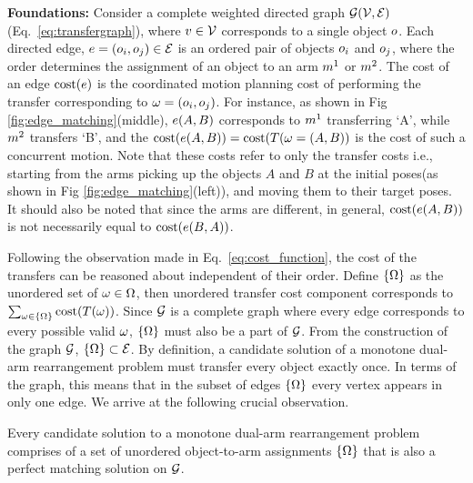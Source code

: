 \noindent\textbf{Foundations:} Consider a complete weighted directed graph $\mathcal{G}(\mathcal{V},\mathcal{E})$ (Eq.~\ref{eq:transfergraph}), where ${v} \in \mathcal{V}$ corresponds to a single object $ o $. Each directed edge, ${e}=(o_i,o_j) \in \mathcal{E}$ is an ordered pair of objects $ o_i $ and $o_j $, where the order determines the assignment of an object to an arm $ m^1 $ or $ m^2 $. The cost of an edge $ \textup{cost}({e}) $ is the coordinated motion planning cost of performing the transfer corresponding to $ {\omega} = (o_i,o_j) $. For instance, as shown in Fig \ref{fig:edge_matching}(middle), ${e}(A,B)$ corresponds to $ m^1 $ transferring `A', while $ m^2 $ transfers `B', and the $\textup{cost}( {e}(A,B) ) = \textup{cost}(T({\omega}=(A,B))$ is the cost of such a concurrent motion. Note that these costs refer to only the transfer costs i.e., starting from the arms picking up the objects $ A $ and $ B $ at the initial poses(as shown in Fig \ref{fig:edge_matching}(left)), and moving them to their target poses. It should also be noted that since the arms are different, in general, $\textup{cost}( {e}(A,B) )$ is not necessarily equal to $\textup{cost}( {e}(B,A) )$.



Following the observation made in Eq.~\ref{eq:cost_function}, the cost of the transfers can be reasoned about independent of their order. 
Define $\{{{\Omega}}\}$ as the unordered set of ${\omega}\in{{\Omega}}$, then unordered transfer cost component corresponds to $\sum_{{\omega}\in\{{{\Omega}}\}}\textup{cost}(T({\omega}))$.
Since $ \mathcal{G} $ is a complete graph where every edge corresponds to every possible valid $ {\omega} $, $ \{{{\Omega}}\} $ must also be a part of $ \mathcal{G} $. 
From the construction of the graph $ \mathcal{G} $, $ \{{{\Omega}}\} \subset \mathcal{E}$. By definition, a candidate solution of a monotone dual-arm rearrangement problem must transfer every object exactly once. In terms of the graph, this means that in the subset of edges $ \{{{\Omega}}\} $ every vertex appears in only one edge. We arrive at the following crucial observation.


\vspace{-0.13in}
{
Every candidate solution to a monotone dual-arm rearrangement problem comprises of a set of unordered object-to-arm assignments $ \{{{\Omega}}\} $ that is also a perfect matching solution on $ \mathcal{G} $.
}

